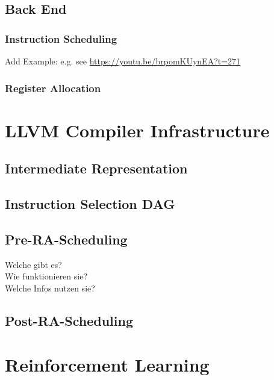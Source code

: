 \subsection{Back End}
\label{sec:bg:compilers:backend}

\subsubsection{Instruction Scheduling}
Add Example: e.g. see \url{https://youtu.be/brpomKUynEA?t=271}

\subsubsection{Register Allocation}

\section{LLVM Compiler Infrastructure}
\subsection{Intermediate Representation}
\subsection{Instruction Selection DAG}
\subsection{Pre-RA-Scheduling}
Welche gibt es?\\
Wie funktionieren sie?\\
Welche Infos nutzen sie?\\
\subsection{Post-RA-Scheduling}

\section{Reinforcement Learning}
